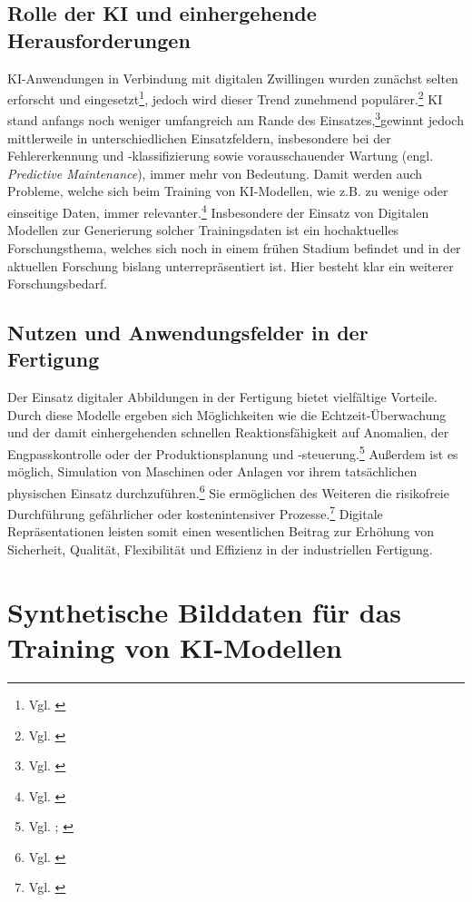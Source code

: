 \subsection{Rolle der \acs{KI} und einhergehende Herausforderungen}
\ac{KI}-Anwendungen in Verbindung mit digitalen Zwillingen wurden zunächst selten erforscht und eingesetzt\footnote{Vgl. \cite[S. 352 ff.]{liu_review_2021}}, jedoch wird dieser Trend zunehmend populärer.\footnote{Vgl. \cite[S. 1]{mikolajewska_generative_2025}} \ac{KI} stand anfangs noch weniger umfangreich am Rande des Einsatzes,\footnote{Vgl. \cite[S. 352 ff.]{liu_review_2021}}gewinnt jedoch mittlerweile in unterschiedlichen Einsatzfeldern, insbesondere bei der Fehlererkennung und -klassifizierung sowie vorausschauender Wartung (engl. \textit{Predictive Maintenance}), immer mehr von Bedeutung. Damit werden auch Probleme, welche sich beim Training von \ac{KI}-Modellen, wie z.B. zu wenige oder einseitige Daten, immer relevanter.\footnote{Vgl. \cite[S. 1]{mikolajewska_generative_2025}} Insbesondere der Einsatz von Digitalen Modellen zur Generierung solcher Trainingsdaten ist ein hochaktuelles Forschungsthema, welches sich noch in einem frühen Stadium befindet und in der aktuellen Forschung bislang unterrepräsentiert ist. Hier besteht klar ein weiterer Forschungsbedarf.

\subsection{Nutzen und Anwendungsfelder in der Fertigung}
Der Einsatz digitaler Abbildungen in der Fertigung bietet vielfältige Vorteile. Durch diese Modelle ergeben sich Möglichkeiten wie die Echtzeit-Überwachung und der damit einhergehenden schnellen Reaktionsfähigkeit auf Anomalien, der Engpasskontrolle oder der Produktionsplanung und -steuerung.\footnote{Vgl. \cite[S. 352 ff.]{liu_review_2021}; \cite[S. 23]{alfaro-viquez_comprehensive_2025}} Außerdem ist es möglich, Simulation von Maschinen oder Anlagen vor ihrem tatsächlichen physischen Einsatz durchzuführen.\footnote{Vgl. \cite[S. 7]{alfaro-viquez_comprehensive_2025}} Sie ermöglichen des Weiteren die risikofreie Durchführung gefährlicher oder kostenintensiver Prozesse.\footnote{Vgl. \cite[S. 6]{zaripov_creation_2025}} Digitale Repräsentationen leisten somit einen wesentlichen Beitrag zur Erhöhung von Sicherheit, Qualität, Flexibilität und Effizienz in der industriellen Fertigung.


\section[Synthetische Bilddaten für das Training von KI-Modellen]{Synthetische Bilddaten für das Training von \ac{KI}-Modellen}
\label{sec:synthetische_daten_section}

